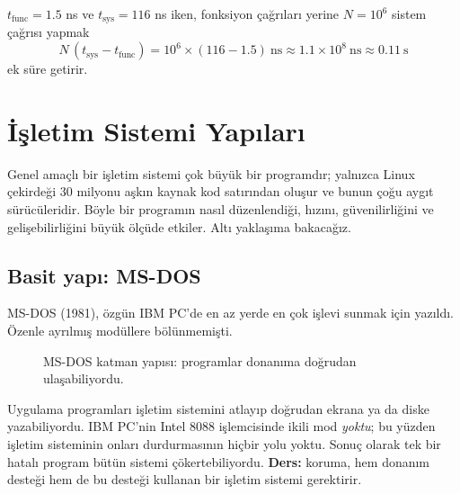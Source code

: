 \begin{example}
$t_{\text{func}} = 1.5$ ns ve $t_{\text{sys}} = 116$ ns iken, fonksiyon çağrıları yerine $N = 10^{6}$ sistem çağrısı yapmak
\[
N\,(t_{\text{sys}} - t_{\text{func}}) = 10^{6} \times (116 - 1.5)\ \text{ns} \approx 1.1\times10^{8}\ \text{ns} \approx 0.11\ \text{s}
\]
ek süre getirir.
\end{example}

\section{İşletim Sistemi Yapıları}
\label{sec:structures}

Genel amaçlı bir işletim sistemi çok büyük bir programdır; yalnızca Linux çekirdeği $30$ milyonu aşkın kaynak kod satırından oluşur ve bunun çoğu aygıt sürücüleridir. Böyle bir programın nasıl düzenlendiği, hızını, güvenilirliğini ve gelişebilirliğini büyük ölçüde etkiler. Altı yaklaşıma bakacağız.

\subsection{Basit yapı: MS-DOS}
\label{sec:simple}

MS-DOS (1981), özgün IBM PC'de en az yerde en çok işlevi sunmak için yazıldı. Özenle ayrılmış modüllere bölünmemişti.

\begin{figure}[H]
\centering
{}
\caption{MS-DOS katman yapısı: programlar donanıma doğrudan ulaşabiliyordu.}
\end{figure}

Uygulama programları işletim sistemini atlayıp doğrudan ekrana ya da diske yazabiliyordu. IBM PC'nin Intel 8088 işlemcisinde ikili mod \emph{yoktu}; bu yüzden işletim sisteminin onları durdurmasının hiçbir yolu yoktu. Sonuç olarak tek bir hatalı program bütün sistemi çökertebiliyordu. \textbf{Ders:} koruma, hem donanım desteği hem de bu desteği kullanan bir işletim sistemi gerektirir.

